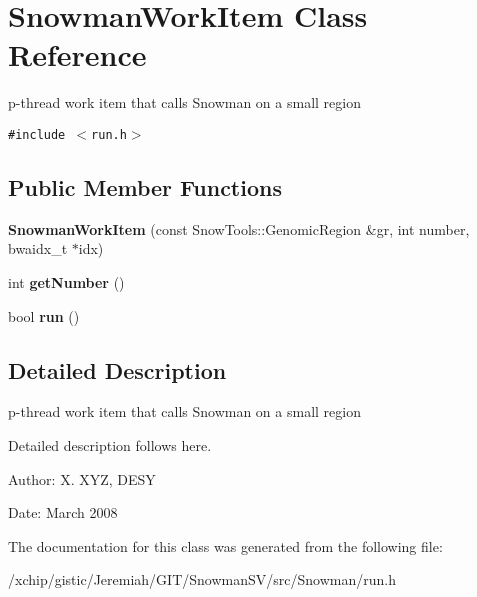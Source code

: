 \section{Snowman\-Work\-Item Class Reference}
\label{classSnowmanWorkItem}
p-thread work item that calls Snowman on a small region  


{\tt \#include $<$run.h$>$}

\subsection*{Public Member Functions}
\begin{CompactItemize}
\item 
\textbf{Snowman\-Work\-Item} (const Snow\-Tools::Genomic\-Region \&gr, int number, bwaidx\_\-t $\ast$idx)\label{classSnowmanWorkItem_8674ff606a631be78c6adf66d62dece1}

\item 
int \textbf{get\-Number} ()\label{classSnowmanWorkItem_17dc850b096e2bf1e7a9cc9c14074554}

\item 
bool \textbf{run} ()\label{classSnowmanWorkItem_b3f388b21eab0af5a3f36f2750f5f3c6}

\end{CompactItemize}


\subsection{Detailed Description}
p-thread work item that calls Snowman on a small region 

Detailed description follows here. \begin{Desc}
\item[Author:]X. XYZ, DESY \end{Desc}
\begin{Desc}
\item[Date:]March 2008 \end{Desc}




The documentation for this class was generated from the following file:\begin{CompactItemize}
\item 
/xchip/gistic/Jeremiah/GIT/Snowman\-SV/src/Snowman/run.h\end{CompactItemize}

